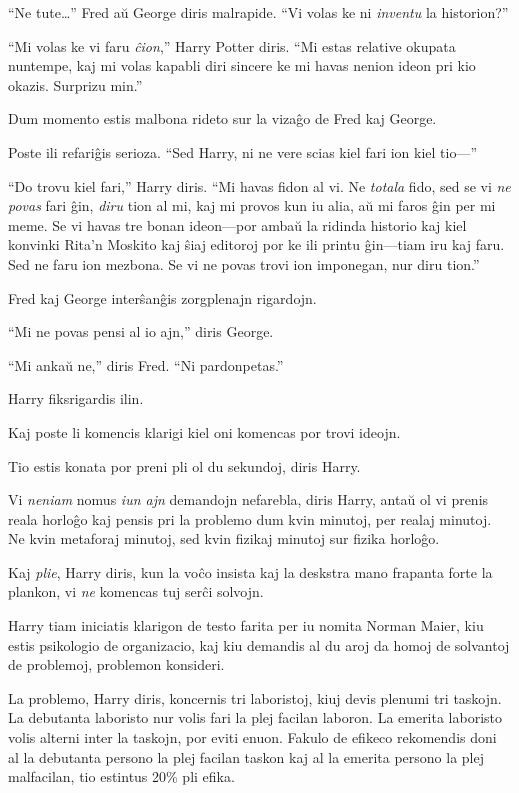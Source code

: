 ``Ne tute\ldots{}'' Fred aŭ George diris malrapide. ``Vi volas ke ni
\emph{inventu} la historion?''

``Mi volas ke vi faru \emph{ĉion},'' Harry Potter diris. ``Mi estas
relative okupata nuntempe, kaj mi volas kapabli diri sincere ke mi
havas nenion ideon pri kio okazis. Surprizu min.''

Dum momento estis malbona rideto sur la vizaĝo de Fred kaj George.

Poste ili refariĝis serioza. ``Sed Harry, ni ne vere scias kiel fari ion kiel tio—'' 

``Do trovu kiel fari,'' Harry diris. ``Mi havas fidon al vi. Ne
\emph{totala} fido, sed se vi \emph{ne povas} fari ĝin, \emph{diru}
tion al mi, kaj mi provos kun iu alia, aŭ mi faros ĝin per mi meme. Se
vi havas tre bonan ideon—por ambaŭ la ridinda historio kaj kiel
konvinki Rita'n Moskito kaj ŝiaj editoroj por ke ili printu ĝin—tiam
iru kaj faru. Sed ne faru ion mezbona. Se vi ne povas trovi ion
imponegan, nur diru tion.''

Fred kaj George interŝanĝis zorgplenajn rigardojn.

``Mi ne povas pensi al io ajn,'' diris George.

``Mi ankaŭ ne,'' diris Fred. ``Ni pardonpetas.''

Harry fiksrigardis ilin.

Kaj poste li komencis klarigi kiel oni komencas por trovi ideojn.

Tio estis konata por preni pli ol du sekundoj, diris Harry.

Vi \emph{neniam} nomus \emph{iun ajn} demandojn nefarebla, diris
Harry, antaŭ ol vi prenis reala horloĝo kaj pensis pri la problemo dum
kvin minutoj, per realaj minutoj. Ne kvin metaforaj minutoj, sed kvin
fizikaj minutoj sur fizika horloĝo.

Kaj \emph{plie}, Harry diris, kun la voĉo insista kaj la deskstra mano
frapanta forte la plankon, vi \emph{ne} komencas tuj serĉi solvojn.

Harry tiam iniciatis klarigon de testo farita per iu nomita Norman
Maier, kiu estis psikologio de organizacio, kaj kiu demandis al du
aroj da homoj de solvantoj de problemoj, problemon konsideri.


La problemo, Harry diris, koncernis tri laboristoj, kiuj devis plenumi
tri taskojn. La debutanta laboristo nur volis fari la plej facilan
laboron. La emerita laboristo volis alterni inter la taskojn, por
eviti enuon. Fakulo de efikeco rekomendis doni al la debutanta persono
la plej facilan taskon kaj al la emerita persono la plej malfacilan,
tio estintus 20\% pli efika.

